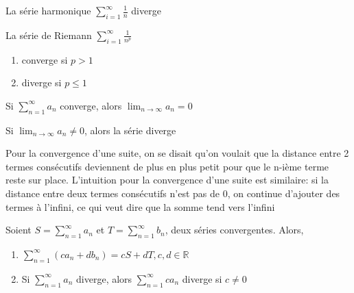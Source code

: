 \documentclass{article}
\begin{document}
\begin{proposition}
\end{proposition}

\begin{proposition}
    La série harmonique $ \sum^{\infty}_{i=1} \frac{1}{n}  $ diverge
\end{proposition}

\begin{proposition}
\end{proposition}

\begin{proposition}
    La série de Riemann $ \sum^{\infty}_{i=1} \frac{1}{n^p}$
    \begin{enumerate}
        \item converge si $ p > 1$
	\item diverge si $ p \leq 1 $
    \end{enumerate}
\end{proposition}

\begin{theorem}
    Si $\sum_{n=1}^{\infty} a_n$ converge, alors
    $\lim_{n \to \infty} a_n=0$
\end{theorem}

\begin{corollary}
    Si $\lim_{n \to \infty} a_n \neq 0$, alors la série diverge
\end{corollary}

\begin{intuition}
    Pour la convergence d'une suite, on se disait qu'on voulait que
    la distance entre 2 termes consécutifs deviennent de plus en plus
    petit pour que le n-ième terme reste sur place. L'intuition pour
    la convergence d'une suite est similaire: si la distance entre
    deux termes consécutifs n'est pas de 0, on continue d'ajouter des
    termes à l'infini, ce qui veut dire que la somme tend vers l'infini
\end{intuition}

\begin{theorem}
    Soient $S = \sum_{n=1}^{\infty} a_n$ et $T = \sum_{n=1}^{\infty} b_n$,
    deux séries convergentes. Alors,
    \begin{enumerate}
	\item $\sum_{n=1}^{\infty} (c a_n + d b_n) = cS + dT, c,d \in
	    \mathbb{R}$
	\item Si $\sum_{n=1}^{\infty} a_n$ diverge, alors
	    $\sum_{n=1}^{\infty} c a_n$ diverge si $ c \neq 0$
    \end{enumerate}
\end{theorem}
\end{document}
